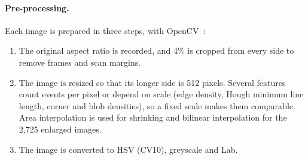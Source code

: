 \documentclass[10pt,twocolumn,a4paper]{article}
\begin{document}
\paragraph{Pre-processing.}
Each image is prepared in three steps, with OpenCV~\cite{bradski2000opencv}:
\begin{enumerate}
\item The original aspect ratio is recorded, and 4\% is cropped from every side to remove frames and scan margins.
\item The image is resized so that its longer side is 512 pixels. Several features count events per pixel or depend on scale (edge density, Hough minimum line length, corner and blob densities), so a fixed scale makes them comparable. Area interpolation is used for shrinking and bilinear interpolation for the 2{,}725 enlarged images.
\item The image is converted to HSV (CV10), greyscale and Lab.
\end{enumerate}
\end{document}
